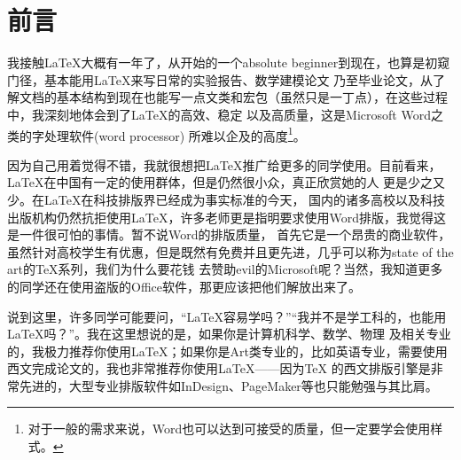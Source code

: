 
\section{前言}
我接触\LaTeX{}大概有一年了，从开始的一个absolute beginner到现在，也算是初窥门径，基本能用\LaTeX{}来写日常的实验报告、数学建模论文
乃至毕业论文，从了解文档的基本结构到现在也能写一点文类和宏包（虽然只是一丁点），在这些过程中，我深刻地体会到了\LaTeX{}的高效、稳定
以及高质量，这是Microsoft Word之类的字处理软件(word processor)
所难以企及的高度\footnote{对于一般的需求来说，Word也可以达到可接受的质量，但一定要学会使用样式。}。

因为自己用着觉得不错，我就很想把\LaTeX{}推广给更多的同学使用。目前看来，\LaTeX{}在中国有一定的使用群体，但是仍然很小众，真正欣赏她的人
更是少之又少。在\LaTeX{}在科技排版界已经成为事实标准的今天，
国内的诸多高校以及科技出版机构仍然抗拒使用\LaTeX{}，许多老师更是指明要求使用Word排版，我觉得这是一件很可怕的事情。暂不说Word的排版质量，
首先它是一个昂贵的商业软件，虽然针对高校学生有优惠，但是既然有免费并且更先进，几乎可以称为state of the art的\TeX{}系列，我们为什么要花钱
去赞助evil的Microsoft呢？当然，我知道更多的同学还在使用盗版的Office软件，那更应该把他们解放出来了。

说到这里，许多同学可能要问，“\LaTeX{}容易学吗？”“我并不是学工科的，也能用\LaTeX{}吗？”。我在这里想说的是，如果你是计算机科学、数学、物理
及相关专业的，我极力推荐你使用\LaTeX{}；如果你是Art类专业的，比如英语专业，需要使用西文完成论文的，我也非常推荐你使用\LaTeX{}——因为\TeX{}
的西文排版引擎是非常先进的，大型专业排版软件如InDesign、PageMaker等也只能勉强与其比肩。

